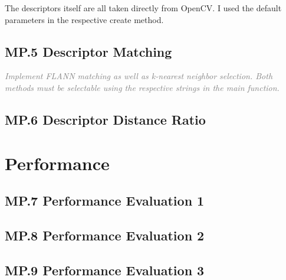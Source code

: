 \documentclass[a4paper]{scrartcl}
\begin{document}
The descriptors itself are all taken directly from OpenCV. I used the default parameters
in the respective create method.

\subsection*{MP.5 Descriptor Matching}
\textcolor{gray}{\textit{Implement FLANN matching as well as k-nearest neighbor selection. Both methods must be selectable using the respective strings in the main function.}}


\subsection*{MP.6 Descriptor Distance Ratio}

\section*{Performance}
\subsection*{MP.7 Performance Evaluation 1}
\subsection*{MP.8 Performance Evaluation 2}
\subsection*{MP.9 Performance Evaluation 3}
\end{document}
